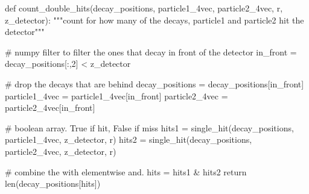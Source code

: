 \documentclass[12pt,a4paper,oneside,english]{article}
\begin{document}
\begin{shaded}
	\begin{python}

def count_double_hits(decay_positions, particle1_4vec, particle2_4vec, r, z_detector):
	"""count for how many of the decays, particle1 and particle2 hit the detector"""
	
	# numpy filter to filter the ones that decay in front of the detector
	in_front = decay_positions[:,2] < z_detector
	
	# drop the decays that are behind
	decay_positions = decay_positions[in_front]
	particle1_4vec = particle1_4vec[in_front]
	particle2_4vec = particle2_4vec[in_front]
	
	# boolean array. True if hit, False if miss
	hits1 = single_hit(decay_positions, particle1_4vec, z_detector, r)
	hits2 = single_hit(decay_positions, particle2_4vec, z_detector, r)
	
	# combine the with elementwise and.
	hits = hits1 & hits2
	return len(decay_positions[hits])

	\end{python}
\end{shaded}
	
\end{document}
